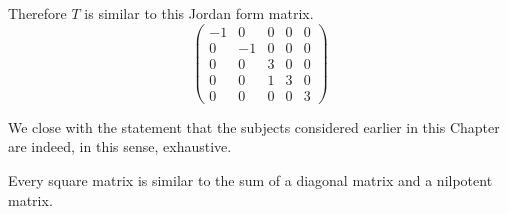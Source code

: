 \begin{example}
Therefore
\( T \) is similar to this Jordan form matrix.
\begin{equation*}
   \begin{pmatrix}
     -1  &0  &0  &0  &0  \\
      0  &-1 &0  &0  &0  \\    
      0  &0  &3  &0  &0  \\
      0  &0  &1  &3  &0  \\
      0  &0  &0  &0  &3  
   \end{pmatrix}
\end{equation*}
\end{example}


We close with the statement that the subjects considered earlier in this
Chapter are indeed, in this sense, exhaustive.

\begin{corollary}
Every square matrix is similar to the sum of a diagonal matrix and a nilpotent
matrix.
\end{corollary}





